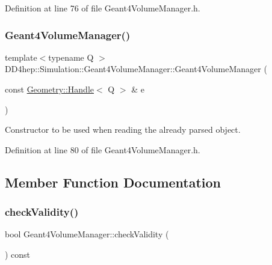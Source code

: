 Definition at line 76 of file Geant4\+Volume\+Manager.\+h.

\hypertarget{class_d_d4hep_1_1_simulation_1_1_geant4_volume_manager_aae74bd41329281e1a472beb176f80df3}{}\label{class_d_d4hep_1_1_simulation_1_1_geant4_volume_manager_aae74bd41329281e1a472beb176f80df3} 
\subsubsection{\texorpdfstring{Geant4\+Volume\+Manager()}{Geant4VolumeManager()}\hspace{0.1cm}{\footnotesize\ttfamily [5/5]}}
{\footnotesize\ttfamily template$<$typename Q $>$ \\
D\+D4hep\+::\+Simulation\+::\+Geant4\+Volume\+Manager\+::\+Geant4\+Volume\+Manager (\begin{DoxyParamCaption}\item[{const \hyperlink{class_d_d4hep_1_1_handle}{Geometry\+::\+Handle}$<$ Q $>$ \&}]{e }\end{DoxyParamCaption})\hspace{0.3cm}{\ttfamily [inline]}}



Constructor to be used when reading the already parsed object. 



Definition at line 80 of file Geant4\+Volume\+Manager.\+h.



\subsection{Member Function Documentation}
\hypertarget{class_d_d4hep_1_1_simulation_1_1_geant4_volume_manager_af20e15293550cbd6b35f362660ceeb5e}{}\label{class_d_d4hep_1_1_simulation_1_1_geant4_volume_manager_af20e15293550cbd6b35f362660ceeb5e} 
\subsubsection{\texorpdfstring{check\+Validity()}{checkValidity()}}
{\footnotesize\ttfamily bool Geant4\+Volume\+Manager\+::check\+Validity (\begin{DoxyParamCaption}{ }\end{DoxyParamCaption}) const\hspace{0.3cm}{\ttfamily [protected]}}



